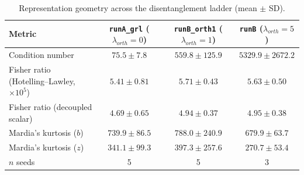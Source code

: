 \begin{table}[htbp]
\centering
\caption{Representation geometry across the disentanglement ladder (mean $\pm$ SD).}
\label{tab:geometry-summary}
\begin{tabular}{lccc}
\toprule
Metric & \texttt{runA\_grl} ($\lambda_{orth}=0$) & \texttt{runB\_orth1} ($\lambda_{orth}=1$) & \texttt{runB} ($\lambda_{orth}=5$) \\
\midrule
Condition number                          & $75.5 \pm 7.8$              & $559.8 \pm 125.9$           & $5329.9 \pm 2672.2$ \\
Fisher ratio (Hotelling--Lawley, $\times10^{5}$) & $5.41 \pm 0.81$      & $5.71 \pm 0.43$              & $5.63 \pm 0.50$ \\
Fisher ratio (decoupled scalar)           & $4.69 \pm 0.65$              & $4.94 \pm 0.37$              & $4.95 \pm 0.38$ \\
Mardia's kurtosis ($b$)                   & $739.9 \pm 86.5$             & $788.0 \pm 240.9$            & $679.9 \pm 63.7$ \\
Mardia's kurtosis ($z$)                   & $341.1 \pm 99.3$             & $397.3 \pm 257.6$            & $270.7 \pm 53.4$ \\
\midrule
$n$ seeds                                 & 5                            & 5                            & 3 \\
\bottomrule
\end{tabular}
\end{table}
